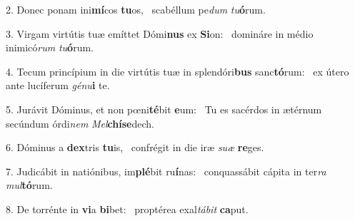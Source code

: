 2. Donec ponam ini\textbf{mí}cos \textbf{tu}os, \ast\  scabéllum pe\textit{dum} \textit{tu}\textbf{ó}rum.\

3. Virgam virtútis tuæ emíttet Dómi\textbf{nus} ex \textbf{Si}on: \ast\  domináre in médio inimicó\textit{rum} \textit{tu}\textbf{ó}rum.\

4. Tecum princípium in die virtútis tuæ in splendóri\textbf{bus} sanc\textbf{tó}rum: \ast\  ex útero ante lucíferum \textit{gé}\textit{nu}\textbf{i} te.\

5. Jurávit Dóminus, et non pœni\textbf{té}bit \textbf{e}um: \ast\  Tu es sacérdos in ætérnum secúndum órdi\textit{nem} \textit{Mel}\textbf{chí}\textbf{se}dech.\

6. Dóminus a \textbf{dex}tris \textbf{tu}is, \ast\  confrégit in die iræ \textit{su}\textit{æ} \textbf{re}ges.\

7. Judicábit in natiónibus, im\textbf{plé}bit ru\textbf{í}nas: \ast\  conquassábit cápita in ter\textit{ra} \textit{mul}\textbf{tó}rum.\

8. De torrénte in \textbf{vi}a \textbf{bi}bet: \ast\  proptérea exal\textit{tá}\textit{bit} \textbf{ca}put.\

